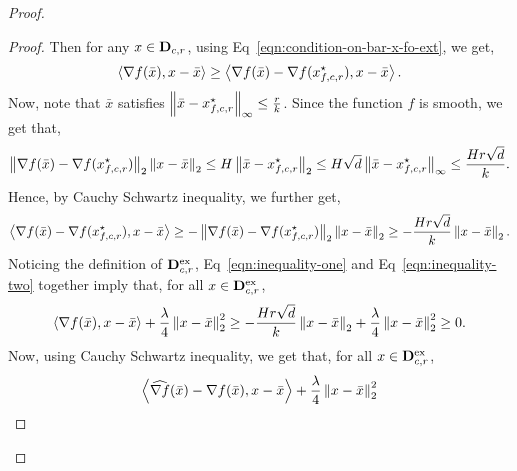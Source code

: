 \begin{proof}
\begin{proof}
Then for any $x\in \mathbf{D}_{c, r}$, using Eq~\eqref{eqn:condition-on-bar-x-fo-ext}, 
we get, 
\begin{equation}
\label{eqn:inequality-one}
\left<\grad f(\bar{x}), x- \bar{x}\right> %
	\geq \left<\grad f(\bar{x}) - \grad f(x_{f, c, r}\opt), x - \bar{x}\right>.
\end{equation}
Now, note that $\bar{x}$ satisfies $\left\|{\bar{x} - x_{f, c, r}^\star}\right\|_\infty 
\leq \frac{r}{k}$. Since the function $f$ is smooth, we get that, 
\begin{equation*}
\left\|{\nabla f(\bar{x}) - \nabla f(x_{f, c, r}^\star)}\right\|_2 \left\|{x-\bar{x}}\right\|_2 
\leq H \left\|{\bar{x} - x_{f, c, r}^\star}\right\|_2 \leq H\sqrt{d}\left\|{\bar{x} - x_{f, c, r}^\star}\right\|_\infty
	\leq \frac{Hr\sqrt{d}}{k}.
\end{equation*} 
Hence, by Cauchy Schwartz inequality, we further get, 
\begin{equation}
\label{eqn:inequality-two}  
\left<\nabla f(\bar{x}) - \nabla f(x_{f, c, r}^\star), x - \bar{x}\right> \geq - 
	\left\|{\nabla f(\bar{x}) - \nabla f(x_{f, c, r}^\star)}\right\|_2 \left\|{x-\bar{x}}\right\|_2
	\geq -\frac{Hr\sqrt{d}}{k}\left\|{x- \bar{x}}\right\|_2.
\end{equation}
Noticing the definition of $\mathbf{D}_{c, r}^\text{ex}$, Eq~\eqref{eqn:inequality-one} and 
Eq~\eqref{eqn:inequality-two} together imply that, for all $x\in \mathbf{D}_{c, r}^\text{ex}$, 
\begin{equation}
\label{eqn:inequality-three}
\left<\nabla f(\bar{x}), x- \bar{x}\right>  + \frac{\lambda}{4}\left\|{x-\bar{x}}\right\|_2^2 
	\geq -\frac{Hr\sqrt{d}}{k}\left\|{x- \bar{x}}\right\|_2 + \frac{\lambda}{4}\left\|{x-\bar{x}}\right\|_2^2 \geq 0.
\end{equation}
Now, using Cauchy Schwartz inequality, we get that, for all $x\in \mathbf{D}_{c, r}^\text{ex}$, 
\begin{equation}
\label{eqn:inequality-five}
\left<\what{\grad f}(\bar{x}) - \grad f(\bar{x}), x- \bar{x}\right> + \frac{\lambda}{4}\norm{x-\bar{x}}_2^2 

\end{equation}
\end{proof}
\end{proof}
